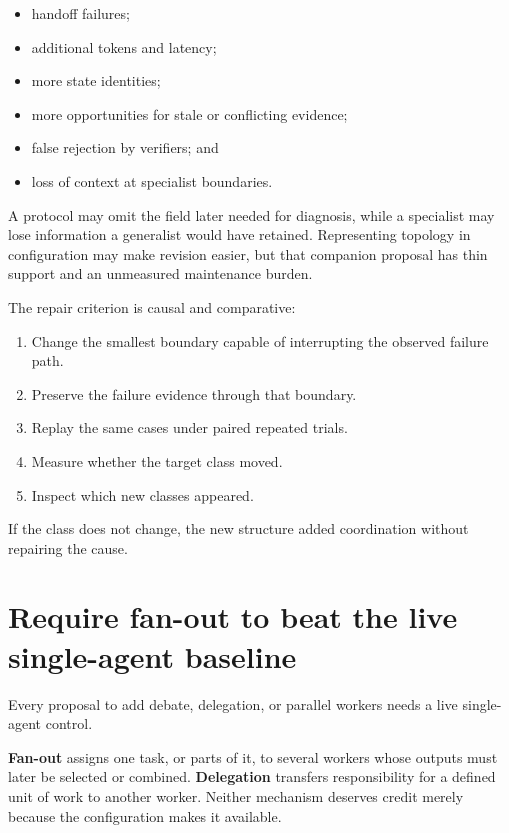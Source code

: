 \begin{itemize}
\tightlist
\item
  handoff failures;
\item
  additional tokens and latency;
\item
  more state identities;
\item
  more opportunities for stale or conflicting evidence;
\item
  false rejection by verifiers; and
\item
  loss of context at specialist boundaries.
\end{itemize}

A protocol may omit the field later needed for diagnosis, while a specialist may lose information a generalist would have retained. Representing topology in configuration may make revision easier, but that companion proposal has thin support and an unmeasured maintenance burden.

The repair criterion is causal and comparative:

\begin{enumerate}
\def\labelenumi{\arabic{enumi}.}
\tightlist
\item
  Change the smallest boundary capable of interrupting the observed failure path.
\item
  Preserve the failure evidence through that boundary.
\item
  Replay the same cases under paired repeated trials.
\item
  Measure whether the target class moved.
\item
  Inspect which new classes appeared.
\end{enumerate}

If the class does not change, the new structure added coordination without repairing the cause.

\section{Require fan-out to beat the live single-agent baseline}\label{require-fan-out-to-beat-the-live-single-agent-baseline}

Every proposal to add debate, delegation, or parallel workers needs a live single-agent control.

\textbf{Fan-out} assigns one task, or parts of it, to several workers whose outputs must later be selected or combined. \textbf{Delegation} transfers responsibility for a defined unit of work to another worker. Neither mechanism deserves credit merely because the configuration makes it available.

